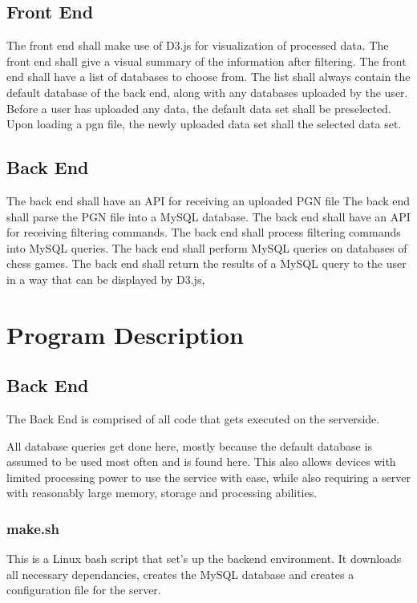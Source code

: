 \documentclass{article}
\begin{document}
\subsection{Front End}
The front end shall make use of D3.js for visualization of processed data.
The front end shall give a visual summary of the information after filtering.
The front end shall have a list of databases to choose from.  The list shall always contain the default database of the back end, along with any databases uploaded by the user.
Before a user has uploaded any data, the default data set shall be preselected.  
Upon loading a pgn file, the newly uploaded data set shall the selected data set.  
  
\subsection{Back End}
The back end shall have an API for receiving an uploaded PGN file
The back end shall parse the PGN file into a MySQL database. 
The back end shall have an API for receiving filtering commands.  
The back end shall process filtering commands into MySQL queries.
The back end shall perform MySQL queries on databases of chess games.  
The back end shall return the results of a MySQL query to the user in a way that can be displayed by D3.js, %

\section{Program Description}

\subsection{Back End}
The Back End is comprised of all code that gets executed on the serverside.  

All database queries get done here, mostly because the default database is assumed to be used most often and is found here. This also allows devices with limited processing power to use the service with ease, while also requiring a server with reasonably large memory, storage and processing abilities.  

\subsubsection{make.sh}
This is a Linux bash script that set's up the backend environment. It downloads all necessary dependancies, creates the MySQL database and creates a configuration file for the server.
\end{document}
